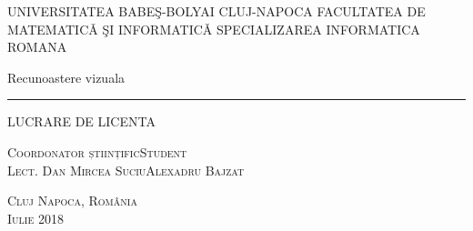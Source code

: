 \begin{titlepage}
	\begin{center}
		\vspace{0.5cm}
		\Large \textsc{UNIVERSITATEA BABEŞ-BOLYAI CLUJ-NAPOCA FACULTATEA DE MATEMATICǍ ŞI INFORMATICǍ 
		SPECIALIZAREA INFORMATICA ROMANA }

		\vfill

		\Huge Recunoastere vizuala
		\rule{\textwidth}{1pt}
		\Large LUCRARE DE LICENTA

		\vfill

		\Large
		\textsc{Coordonator științific}\hfill \textsc{Student}
		\\
		\large
		\textsc{Lect. Dan Mircea Suciu}\hfill \textsc{Alexadru Bajzat}
	
		\vspace{1.5cm}
		\textsc{Cluj Napoca, România}\\
		\textsc{Iulie 2018}

	\end{center}
\end{titlepage}
 
